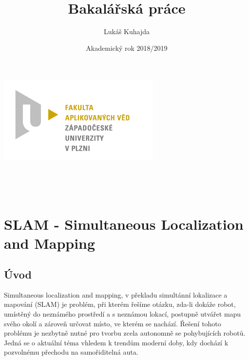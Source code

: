 \documentclass[11pt]{article}
\begin{document}
\title{Bakalářská práce}
\author{Lukáš Kuhajda}
\date{Akademický rok 2018/2019}
\begin{titlepage}
	\begin{center}
		\includegraphics[scale=0.5]{logo_zcu}\\
		\vspace{5cm}
		\begin{Large}
			\textbf{\thetitle}\\
		\end{Large}
		
		\vspace{3cm}
		\theauthor\\
		\vspace{5cm}
		\thedate
	\end{center}
\end{titlepage}
\newpage	
	
\tableofcontents
\newpage



\section{SLAM - Simultaneous Localization and Mapping}

\subsection{Úvod}
Simultaneous localization and mapping, v překladu simultánní lokalizace a mapování (SLAM) je problém, při kterém řešíme otázku, zda-li dokáže robot, umístěný do neznámého prostředí a s neznámou lokací, postupně utvářet mapu svého okolí a zároveň určovat místo, ve kterém se nachází. Řešení tohoto problému je nezbytně nutné pro tvorbu zcela autonomně se pohybujících robotů. Jedná se o aktuální téma vhledem k trendům moderní doby, kdy dochází k pozvolnému přechodu na samořiditelná auta. \\
\end{document}
